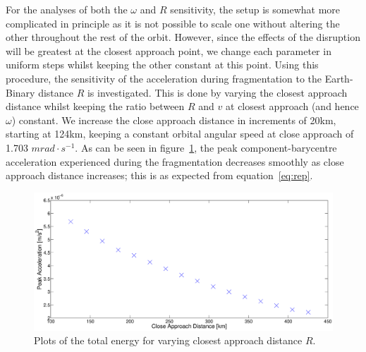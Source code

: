 \documentclass[letterpaper, preprint, paper,11pt]{AAS}	%
\begin{document}
For the analyses of both the $\omega$ and $R$ sensitivity, the setup is somewhat more complicated in principle as it is not possible to scale one without altering the other throughout the rest of the orbit. However, since the effects of the disruption will be greatest at the closest approach point, we change each parameter in uniform steps whilst keeping the other constant at this point. 
Using this procedure, the sensitivity of the acceleration during fragmentation to the Earth-Binary distance $R$ is investigated. This is done by varying the closest approach distance whilst keeping the ratio between $R$ and $v$ at closest approach (and hence $\omega$) constant. We increase the close approach distance in increments of 20km, starting at 124km, keeping a constant orbital angular speed at close approach of 1.703 $mrad \cdot s^{-1}$. As can be seen in figure~\ref{fig:Rsens}, the peak component-barycentre acceleration experienced during the fragmentation decreases smoothly as close approach distance increases; this is as expected from equation~\ref{eq:rep}.
\begin{figure}[H]
\centering
\centerline{\includegraphics[width=1.2\textwidth]{Rsens_accel_1.eps}} 
\caption{Plots of the total energy for varying closest approach distance $R$.} 
\label{fig:Rsens}
\end{figure} 
\end{document}

